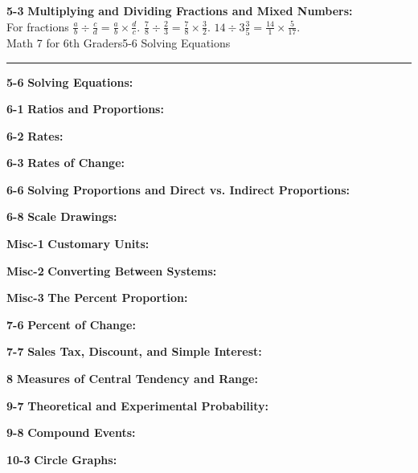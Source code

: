 \begin{enumerate*}
		\item[\Large\textbf{5-3}] \Large\textbf{Multiplying and Dividing Fractions and Mixed Numbers:}\\
			For fractions $\frac{a}{b}\div\frac{c}{d}=\frac{a}{b}\times\frac{d}{c}$. $\frac{7}{8}\div\frac{2}{3}=\frac{7}{8}\times\frac{3}{2}$. $14\div 3\frac{3}{5}=\frac{14}{1}\times\frac{5}{17}$.\\

\newpage
\noindent\Large{Math 7 for 6th Graders\hfill 5-6 Solving Equations}
\noindent\hrule
\vspace{5mm}

		\item[\Large\textbf{5-6}] \Large\textbf{Solving Equations:}\\
		\item[\Large\textbf{6-1}] \Large\textbf{Ratios and Proportions:}\\
		\item[\Large\textbf{6-2}] \Large\textbf{Rates:}\\
		\item[\Large\textbf{6-3}] \Large\textbf{Rates of Change:}\\
		\item[\Large\textbf{6-6}] \Large\textbf{Solving Proportions and Direct vs. Indirect Proportions:}\\
		\item[\Large\textbf{6-8}] \Large\textbf{Scale Drawings:}\\
		\item[\Large\textbf{Misc-1}] \Large\textbf{Customary Units:}\\
		\item[\Large\textbf{Misc-2}] \Large\textbf{Converting Between Systems:}\\
		\item[\Large\textbf{Misc-3}] \Large\textbf{The Percent Proportion:}\\
		\item[\Large\textbf{7-6}] \Large\textbf{Percent of Change:}\\
		\item[\Large\textbf{7-7}] \Large\textbf{Sales Tax, Discount, and Simple Interest:}\\
		\item[\Large\textbf{8}] \Large\textbf{Measures of Central Tendency and Range:}\\
		\item[\Large\textbf{9-7}] \Large\textbf{Theoretical and Experimental Probability:}\\
		\item[\Large\textbf{9-8}] \Large\textbf{Compound Events:}\\
		\item[\Large\textbf{10-3}] \Large\textbf{Circle Graphs:}\\

	\end{enumerate*}